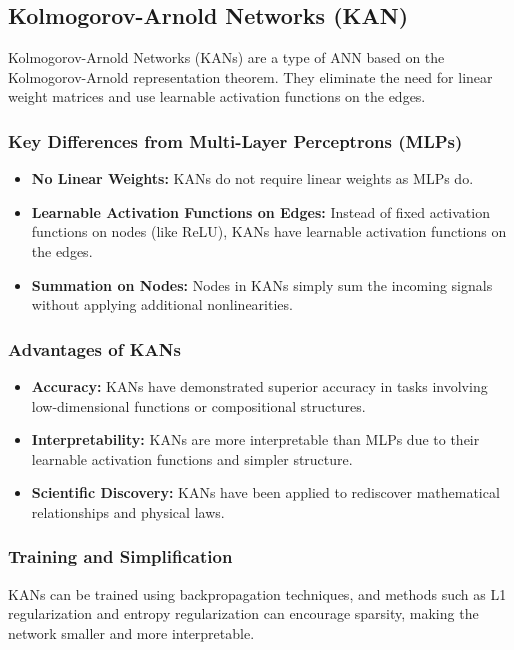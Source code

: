 \documentclass{article}
\begin{document}
\subsection{Kolmogorov-Arnold Networks (KAN)}
Kolmogorov-Arnold Networks (KANs) are a type of ANN based on the Kolmogorov-Arnold representation theorem. They eliminate the need for linear weight matrices and use learnable activation functions on the edges.

\subsubsection{Key Differences from Multi-Layer Perceptrons (MLPs)}
\begin{itemize}
    \item \textbf{No Linear Weights:} KANs do not require linear weights as MLPs do.
    \item \textbf{Learnable Activation Functions on Edges:} Instead of fixed activation functions on nodes (like ReLU), KANs have learnable activation functions on the edges.
    \item \textbf{Summation on Nodes:} Nodes in KANs simply sum the incoming signals without applying additional nonlinearities.
\end{itemize}

\subsubsection{Advantages of KANs}
\begin{itemize}
    \item \textbf{Accuracy:} KANs have demonstrated superior accuracy in tasks involving low-dimensional functions or compositional structures.
    \item \textbf{Interpretability:} KANs are more interpretable than MLPs due to their learnable activation functions and simpler structure.
    \item \textbf{Scientific Discovery:} KANs have been applied to rediscover mathematical relationships and physical laws.
\end{itemize}

\subsubsection{Training and Simplification}
KANs can be trained using backpropagation techniques, and methods such as L1 regularization and entropy regularization can encourage sparsity, making the network smaller and more interpretable.
\end{document}
